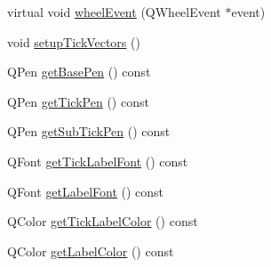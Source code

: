 \begin{DoxyCompactItemize}
\item 
virtual void \hyperlink{class_q_c_p_axis_a71643d27524a843230b5ba68085b3d9b}{wheel\+Event} (Q\+Wheel\+Event $\ast$event)
\item 
void \hyperlink{class_q_c_p_axis_a57d9e961bae7d62f5b4e1f143e660c78}{setup\+Tick\+Vectors} ()
\item 
Q\+Pen \hyperlink{class_q_c_p_axis_a8cd3764c6a4ce9c3d7d913e81cad0a50}{get\+Base\+Pen} () const
\item 
Q\+Pen \hyperlink{class_q_c_p_axis_afe7d57415cbbf31e5549a5cc40b6f8d8}{get\+Tick\+Pen} () const
\item 
Q\+Pen \hyperlink{class_q_c_p_axis_aad7739c229b292ddab0b3a43a5676f54}{get\+Sub\+Tick\+Pen} () const
\item 
Q\+Font \hyperlink{class_q_c_p_axis_a694ab8b4240f3c90a866372e3dcb364f}{get\+Tick\+Label\+Font} () const
\item 
Q\+Font \hyperlink{class_q_c_p_axis_aeac21c907d2516af9cde9a463043d671}{get\+Label\+Font} () const
\item 
Q\+Color \hyperlink{class_q_c_p_axis_a8d00d5b78ecfbebbea5a8161bddb9a17}{get\+Tick\+Label\+Color} () const
\item 
Q\+Color \hyperlink{class_q_c_p_axis_ae914abd56afa570cb9f2ab50e59c0f0e}{get\+Label\+Color} () const
\end{DoxyCompactItemize}
